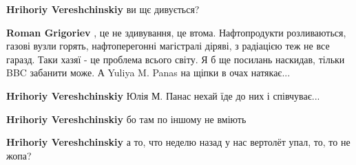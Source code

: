 \begin{itemize}
\begin{itemize}
 
\textbf{Hrihoriy Vereshchinskiy} ви щє дивується?

\begin{itemize}
 
\textbf{Roman Grigoriev} , це не здивування, це втома. Нафтопродукти розливаються, газові вузли горять, нафтоперегонні магістралі діряві, з радіацією теж не все гаразд. Таки хазяї - це проблема всього світу. Я б ще посилань наскидав, тільки BBC забанити може. А Yuliya M. Panas на щіпки в очах натякає...

 
\textbf{Hrihoriy Vereshchinskiy} Юлія М. Панас нехай їде до них і співчуває...
\end{itemize}

 
\textbf{Hrihoriy Vereshchinskiy} бо там по іншому не вміють

 
\textbf{Hrihoriy Vereshchinskiy} а то, что неделю назад у нас вертолёт упал, то, то не жопа?

\begin{itemize}
 

\end{itemize}
\end{itemize}
\end{itemize}
